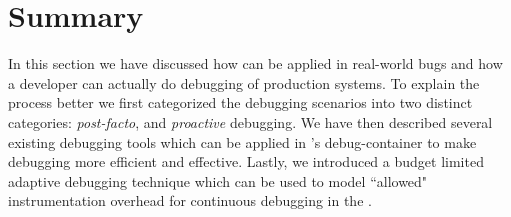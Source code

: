 \section{Summary}
\label{sec:activeSummary}

In this section we have discussed how \parikshan can be applied in real-world bugs and how a developer can actually do debugging of production systems. 
To explain the process better we first categorized the debugging scenarios into two distinct categories: \emph{post-facto}, and \emph{proactive} debugging.
We have then described several existing debugging tools which can be applied in \parikshan's debug-container to make debugging more efficient and effective.
Lastly, we introduced a budget limited adaptive debugging technique which can be used to model ``allowed" instrumentation overhead for continuous debugging in the \debugcontainer.
